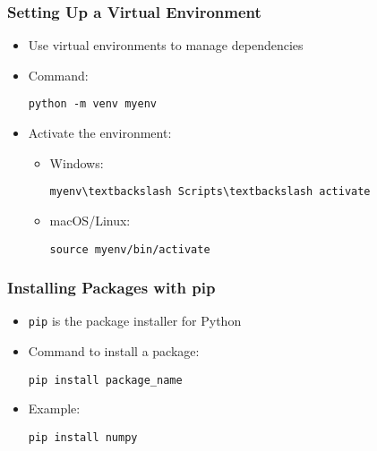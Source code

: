 \documentclass{beamer}
\begin{document}
\begin{frame}
    \frametitle{Setting Up a Virtual Environment}
    \begin{itemize}
        \item Use virtual environments to manage dependencies
        \item Command:
        \begin{tcolorbox}[colback=lightblue, colframe=darkblue, title=Create Virtual Environment]
            \lstinline|python -m venv myenv|
        \end{tcolorbox}
        \item Activate the environment:
        \begin{itemize}
            \item Windows:
            \begin{tcolorbox}[colback=lightblue, colframe=darkblue, title=Activate Windows]
                \lstinline|myenv\textbackslash Scripts\textbackslash activate|
            \end{tcolorbox}
            \item macOS/Linux:
            \begin{tcolorbox}[colback=lightblue, colframe=darkblue, title=Activate macOS/Linux]
                \lstinline|source myenv/bin/activate|
            \end{tcolorbox}
        \end{itemize}
    \end{itemize}
\end{frame}

\begin{frame}
    \frametitle{Installing Packages with pip}
    \begin{itemize}
        \item \texttt{pip} is the package installer for Python
        \item Command to install a package:
        \begin{tcolorbox}[colback=lightblue, colframe=darkblue, title=Install Package]
            \lstinline|pip install package_name|
        \end{tcolorbox}
        \item Example:
        \begin{tcolorbox}[colback=lightblue, colframe=darkblue, title=Install Numpy]
            \lstinline|pip install numpy|
        \end{tcolorbox}
    \end{itemize}
\end{frame}
\end{document}
